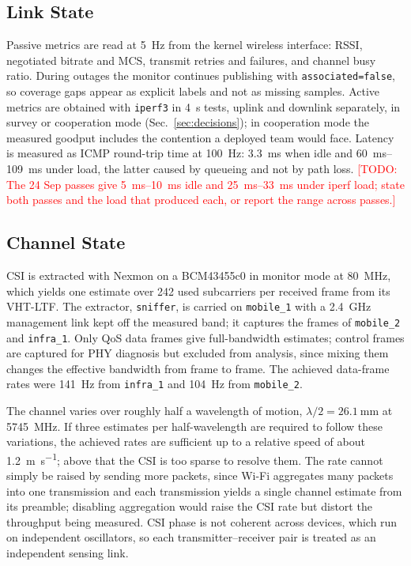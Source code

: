 \documentclass[journal]{IEEEtran}
\newcommand{\todo}[1]{\textcolor{red}{[TODO: #1]}}
\begin{document}
\subsection{Link State}
Passive metrics are read at \SI{5}{\hertz} from the kernel wireless
interface: RSSI, negotiated bitrate and MCS, transmit retries and
failures, and channel busy ratio. During outages the monitor continues
publishing with \texttt{associated=false}, so coverage gaps appear as
explicit labels and not as missing samples. Active metrics are
obtained with \texttt{iperf3} \cite{iperf3} in \SI{4}{\second} tests,
uplink and downlink separately, in survey or cooperation mode
(Sec.~\ref{sec:decisions}); in cooperation mode the measured goodput
includes the contention a deployed team would face. Latency is
measured as ICMP round-trip time at \SI{100}{\hertz}:
\SI{3.3}{\milli\second} when idle and \SIrange{60}{109}{\milli\second}
under load, the latter caused by queueing and not by path loss.
\todo{The 24 Sep passes give \SIrange{5}{10}{\milli\second} idle and
\SIrange{25}{33}{\milli\second} under iperf load; state both passes
and the load that produced each, or report the range across passes.}

\subsection{Channel State}
\label{sec:csi}
CSI is extracted with Nexmon \cite{nexmon} on a BCM43455c0 in monitor
mode at \SI{80}{\mega\hertz}, which yields one estimate over 242 used
subcarriers per received frame from its VHT-LTF. The extractor,
\texttt{sniffer}, is carried on \texttt{mobile\_1} with a
\SI{2.4}{\giga\hertz} management link kept off the measured band; it
captures the frames of \texttt{mobile\_2} and \texttt{infra\_1}. Only
QoS data frames give full-bandwidth estimates; control frames are
captured for PHY diagnosis but excluded from analysis, since mixing
them changes the effective bandwidth from frame to frame. The achieved
data-frame rates were \SI{141}{\hertz} from \texttt{infra\_1} and
\SI{104}{\hertz} from \texttt{mobile\_2}.

The channel varies over roughly half a wavelength of motion,
$\lambda/2 = \SI{26.1}{\milli\metre}$ at \SI{5745}{\mega\hertz}. If
three estimates per half-wavelength are required to follow these
variations, the achieved rates are sufficient up to a relative speed
of about \SI{1.2}{\metre\per\second}; above that the CSI is too sparse
to resolve them. The rate cannot simply be raised by sending more
packets, since Wi-Fi aggregates many packets into one transmission and
each transmission yields a single channel estimate from its preamble;
disabling aggregation would raise the CSI rate but distort the
throughput being measured. CSI phase is not coherent across devices,
which run on independent oscillators, so each transmitter--receiver
pair is treated as an independent sensing link.
\end{document}
